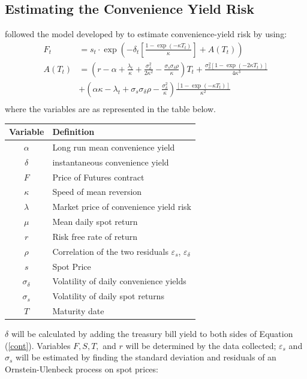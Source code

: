 \documentclass{paper}
\let\oldref\ref
\renewcommand{\ref}[1]{(\oldref{#1})}
\begin{document}
\begin{doublespacing}
\subsection{Estimating the Convenience Yield Risk}
\citeauthor{ozvatic2015} followed the model developed by \cite{gibsschw1990} to estimate convenience-yield risk by using:
\begin{align*}
F_{t} &= s_{t}\cdot\exp\left(-\delta_{t}\left[\frac{1-\exp(-\kappa T_{t})}{\kappa}\right]+ A(T_{t})\right)\\
A(T_{t}) &= \left(r-\alpha + \frac{\lambda_{t}}{\kappa}+\frac{\sigma^{2}_{\delta}}{2\kappa^{2}} - \frac{\sigma_{s}\sigma_{\delta}\rho}{\kappa}\right)T_{t}+ \frac{\sigma^{2}_{\delta}[1-\exp(-2\kappa T_{t})]}{4\kappa^{3}}\\
& + \left(\alpha\kappa - \lambda_{t} + \sigma_{s}\sigma_{\delta}\rho - \frac{\sigma^{2}_{\delta}}{\kappa} \right)\frac{[1-\exp(-\kappa T_{t})]}{\kappa^{2}}\\
\end{align*}
where the variables are as represented in the table below.
\begin{center}
\begin{tabular}{ c| l }
 Variable & Definition \\\hline
 $\alpha$ & Long run mean convenience yield \\  
 $\delta$ & instantaneous convenience yield\\
 $F$ & Price of Futures contract\\
 $\kappa$ & Speed of mean reversion \\
 $\lambda$ & Market price of convenience yield risk\\
 $\mu$ & Mean daily spot return\\
 $r$ & Risk free rate of return \\
 $\rho$ & Correlation of the two residuals $\varepsilon_{s}$, $\varepsilon_{\delta}$ \\
 $s$ & Spot Price \\ 
 $\sigma_{\delta}$ & Volatility of daily convenience yields\\
 $\sigma_{s}$ & Volatility of daily spot returns \\
 $T$ & Maturity date \\ 
\end{tabular}
\end{center}
$\delta$ will be calculated by adding the treasury bill yield to both sides of Equation \ref{cont}. Variables $F,S,T,$ and $r$ will be determined by the data collected; $\varepsilon_{s}$ and $\sigma_{s}$ will be estimated by finding the standard deviation and residuals of an Ornstein-Ulenbeck process on spot prices:

\end{doublespacing}
\end{document}
